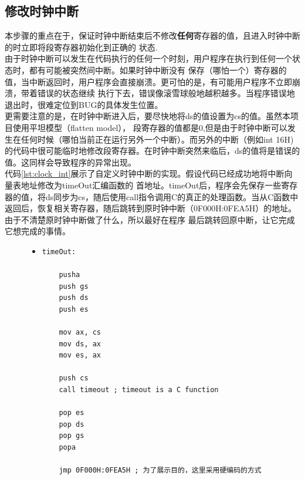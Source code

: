 \documentclass[a4paper]{article}
\begin{document}
    \subsection{修改时钟中断}
    本步骤的重点在于，保证时钟中断结束后不修改\textbf{任何}寄存器的值，且进入时钟中断的时立即将段寄存器初始化到正确的
    状态.\\
    
    由于时钟中断可以发生在代码执行的任何一个时刻，用户程序在执行到任何一个状态时，都有可能被突然间中断。如果时钟中断没有
    保存（哪怕一个）寄存器的值，当中断返回时，用户程序会直接崩溃。更可怕的是，有可能用户程序不立即崩溃，带着错误的状态继续
    执行下去，错误像滚雪球般地越积越多。当程序错误地退出时，很难定位到BUG的具体发生位置。\\
    
    更需要注意的是，在时钟中断进入后，要尽快地将ds的值设置为cs的值。虽然本项目使用平坦模型（flatten model），
    段寄存器的值都是0,但是由于时钟中断可以发生在任何时候（哪怕当前正在运行另外一个中断）。而另外的中断（例如int 16H)
    的代码中很可能临时地修改段寄存器。在时钟中断突然来临后，ds的值将是错误的值。这同样会导致程序的异常出现。\\
    
    代码\ref{lst:clock_int}展示了自定义时钟中断的实现。假设代码已经成功地将中断向量表地址修改为timeOut汇编函数的
    首地址。timeOut后，程序会先保存一些寄存器的值，将ds同步为cs，随后使用call指令调用C的真正的处理函数。当从C函数中
    返回后，恢复相关寄存器，随后跳转到原时钟中断（0F000H:0FEA5H）的地址。由于不清楚原时钟中断做了什么，所以最好在程序
    最后跳转回原中断，让它完成它想完成的事情。
    \begin{figure}[!bht]
    \begin{itemize}
    \item[] \begin{lstlisting}[language={[x86masm]Assembler}, label=lst:clock_int, caption=自定义时钟中断的部分代码]
timeOut:

    pusha
    push gs
    push ds
    push es

    mov ax, cs 
    mov ds, ax 
    mov es, ax 

    push cs 
    call timeout ; timeout is a C function

    pop es
    pop ds
    pop gs
    popa

    jmp 0F000H:0FEA5H ; 为了展示目的，这里采用硬编码的方式
    \end{lstlisting}
    \end{itemize}
    \end{figure}
\end{document}
